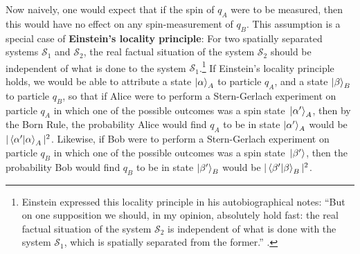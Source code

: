 Now naively, one would expect that if the spin of $q_A$ were to be measured, then this would have no effect on any spin-measurement of $q_B$. This assumption is a special case of \textbf{Einstein's locality principle}:\label{EinsteinLocalityPrinciple} For two spatially separated systems $\mathcal{S}_1$ and $\mathcal{S}_2$, %
%
the real factual situation of the system $\mathcal{S}_2$ should be independent of what is done to the system $\mathcal{S}_1$.\footnote{Einstein expressed this locality principle in his autobiographical notes: ``But on one supposition we should, in my opinion, absolutely hold fast: the real factual situation of the system $\mathcal{S}_2$ is independent of what is done with the system $\mathcal{S}_1$, which is spatially separated from the former.'' \cite[p. 85]{EinsteinLocality}.} If Einstein's locality principle holds, we would be able to attribute a state $\ket{\alpha}_A$ to particle $q_A$, and a state $\ket{\beta}_B$ to particle $q_B$, %
%
so that if Alice were to perform a Stern-Gerlach experiment on particle $q_A$ in which one of the possible outcomes was a spin state $\ket*{\alpha'}_A$, then by the Born Rule, the probability Alice would find $q_A$ to be in state $\ket{\alpha'}_A$ would be $|\ip{\alpha'}{\alpha}_A|^2$. Likewise, if Bob were to perform a Stern-Gerlach experiment on particle $q_B$ in which one of the possible outcomes was a spin state $\ket*{\beta'}$, then the probability Bob would find $q_B$ to be in state $\ket{\beta'}_B$ would be $|\ip{\beta'}{\beta}_B|^2$. 

